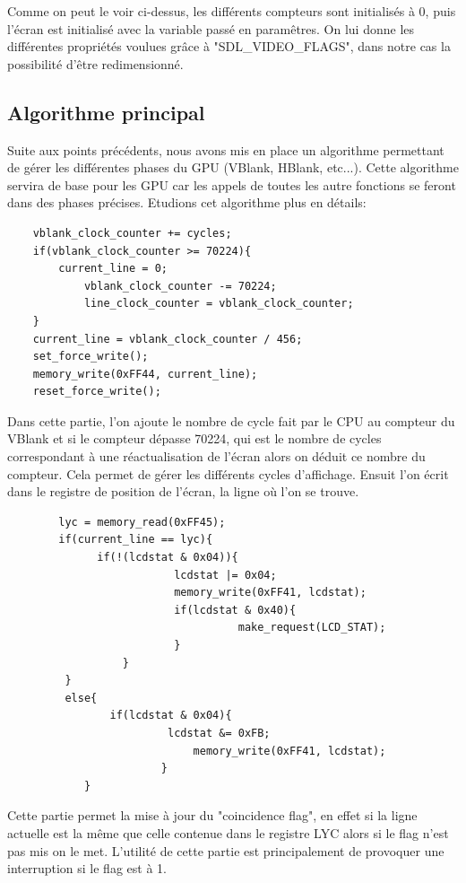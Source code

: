 \documentclass{report}
\begin{document}
Comme on peut le voir ci-dessus, les différents compteurs sont initialisés à 0, puis l'écran est initialisé avec la variable passé en paramêtres. On lui donne les différentes propriétés voulues grâce à "SDL\_VIDEO\_FLAGS", dans notre cas la possibilité d'être redimensionné.\\

\subsection{Algorithme principal}
	Suite aux points précédents, nous avons mis en place un algorithme permettant de gérer les différentes phases du GPU (VBlank, HBlank, etc...). Cette algorithme servira de base pour les GPU car les appels de toutes les autre fonctions se feront dans des phases précises. Etudions cet algorithme plus en détails:\\

\begin{lstlisting}
	vblank_clock_counter += cycles;
	if(vblank_clock_counter >= 70224){
		current_line = 0;
      		vblank_clock_counter -= 70224;
        	line_clock_counter = vblank_clock_counter;
	}
	current_line = vblank_clock_counter / 456;
	set_force_write();
	memory_write(0xFF44, current_line);
	reset_force_write();
\end{lstlisting}	

Dans cette partie, l'on ajoute le nombre de cycle fait par le CPU au compteur du VBlank et si le compteur dépasse 70224, qui est le nombre de cycles correspondant à une réactualisation de l'écran alors on déduit ce nombre du compteur. Cela permet de gérer les différents cycles d'affichage. Ensuit l'on écrit dans le registre de position de l'écran, la ligne où l'on se trouve.

\begin{lstlisting}                                        
     	lyc = memory_read(0xFF45);
        if(current_line == lyc){                        
          	  if(!(lcdstat & 0x04)){                  
                       	  lcdstat |= 0x04;
                          memory_write(0xFF41, lcdstat);
                          if(lcdstat & 0x40){
    	                            make_request(LCD_STAT);
                          }
                  }
         }
         else{
             	if(lcdstat & 0x04){
       		             lcdstat &= 0xFB;
                             memory_write(0xFF41, lcdstat);
                        }
         	}

\end{lstlisting}
Cette partie permet la mise à jour du "coincidence flag", en effet si la ligne actuelle est la même que celle contenue dans le registre LYC alors si le flag n'est pas mis on le met. L'utilité de cette partie est principalement de provoquer une interruption si le flag est à 1.
\end{document}
